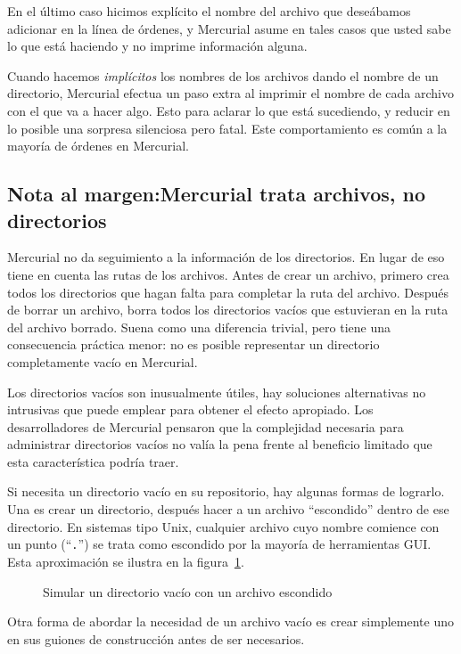 En el último caso hicimos explícito el nombre del archivo que
deseábamos adicionar en la línea de órdenes, y Mercurial asume en
tales casos que usted sabe lo que está haciendo y no imprime
información alguna.

Cuando hacemos \emph{implícitos} los nombres de los archivos dando el
nombre de un directorio, Mercurial efectua un paso extra al imprimir
el nombre de cada archivo con el que va a hacer algo.  Esto para
aclarar lo que está sucediendo, y reducir en lo posible una sorpresa
silenciosa pero fatal.  Este comportamiento es común a la mayoría de
órdenes en Mercurial.

\subsection{Nota al margen:Mercurial trata archivos, no directorios}

Mercurial no da seguimiento a la información de los directorios.  En
lugar de eso tiene en cuenta las rutas de los archivos.  Antes  de
crear un archivo, primero crea todos los directorios que hagan falta
para completar la ruta del archivo. Después de borrar un archivo,
borra todos los directorios vacíos que estuvieran en la ruta del
archivo borrado. Suena como una diferencia trivial, pero tiene una
consecuencia práctica menor: no es posible representar un directorio
completamente vacío en Mercurial.

Los directorios vacíos son inusualmente útiles, hay soluciones
alternativas no intrusivas que puede emplear para obtener el efecto
apropiado. Los desarrolladores de Mercurial pensaron que la
complejidad necesaria para administrar directorios vacíos no valía la
pena frente al beneficio limitado que esta característica podría traer.

Si necesita un directorio vacío en su repositorio, hay algunas formas
de lograrlo. Una es crear un directorio, después hacer  a
un archivo ``escondido'' dentro de ese directorio. En sistemas tipo
Unix, cualquier archivo cuyo nombre comience con un punto
(``\texttt{.}'') se trata como escondido por la mayoría de
herramientas GUI. Esta aproximación se ilustra en la figura~\ref{ex:daily:hidden}.

\begin{figure}[ht]
  \caption{Simular un directorio vacío con un archivo escondido}
  \label{ex:daily:hidden}
\end{figure}

Otra forma de abordar la necesidad de un archivo vacío es crear
simplemente uno en sus guiones de construcción antes de ser necesarios.

